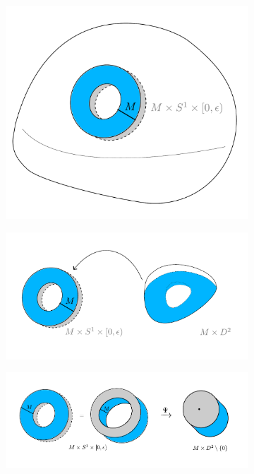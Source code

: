 \begin{figure}
    \begin{subfigure}[t]{.293\linewidth}
        \includegraphics[width=\linewidth]{../images/blow_down_before.pdf}
    \end{subfigure}\hspace*{.1\linewidth}
    \begin{subfigure}[t]{.6\linewidth}
        \includegraphics[width=\linewidth]{../images/blow_down_topology.pdf}
    \end{subfigure}
    \begin{subfigure}{.9\linewidth}
        \includegraphics[width=\linewidth]{../images/blow_down_contact.pdf}

\end{subfigure}
\end{figure}
